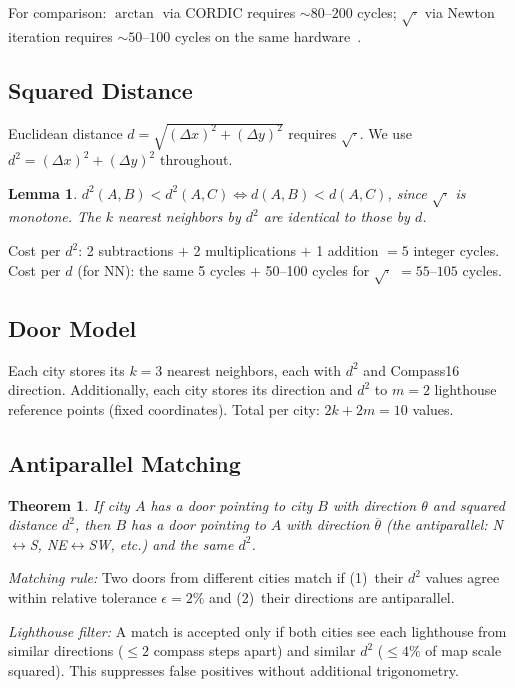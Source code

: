 \documentclass[11pt,a4paper,twocolumn]{article}
\newtheorem{theorem}{Theorem}
\newtheorem{lemma}{Lemma}
\begin{document}
For comparison: $\arctan$ via CORDIC requires ${\sim}80$--$200$ cycles; $\sqrt{\cdot}$ via Newton iteration requires ${\sim}50$--$100$ cycles on the same hardware~\cite{avr_manual}.

\subsection{Squared Distance}\label{sec:dsq}

Euclidean distance $d = \sqrt{(\Delta x)^2 + (\Delta y)^2}$ requires $\sqrt{\cdot}$. We use $d^2 = (\Delta x)^2 + (\Delta y)^2$ throughout.

\begin{lemma}
$d^2(A,B) < d^2(A,C) \Leftrightarrow d(A,B) < d(A,C)$, since $\sqrt{\cdot}$ is monotone. The $k$ nearest neighbors by $d^2$ are identical to those by $d$.
\end{lemma}

Cost per $d^2$: 2 subtractions $+$ 2 multiplications $+$ 1 addition $= 5$ integer cycles. Cost per $d$ (for NN): the same 5 cycles $+$ 50--100 cycles for $\sqrt{\cdot}$ $= 55$--$105$ cycles.

\subsection{Door Model}

Each city stores its $k{=}3$ nearest neighbors, each with $d^2$ and Compass16 direction. Additionally, each city stores its direction and $d^2$ to $m{=}2$ lighthouse reference points (fixed coordinates). Total per city: $2k + 2m = 10$ values.

\subsection{Antiparallel Matching}\label{sec:matching}

\begin{theorem}
If city $A$ has a door pointing to city $B$ with direction $\theta$ and squared distance $d^2$, then $B$ has a door pointing to $A$ with direction $\overline{\theta}$ (the antiparallel: N$\leftrightarrow$S, NE$\leftrightarrow$SW, etc.) and the same $d^2$.
\end{theorem}

\textit{Matching rule:} Two doors from different cities match if (1)~their $d^2$ values agree within relative tolerance $\epsilon{=}2\%$ and (2)~their directions are antiparallel.

\textit{Lighthouse filter:} A match is accepted only if both cities see each lighthouse from similar directions ($\leq 2$ compass steps apart) and similar $d^2$ ($\leq 4\%$ of map scale squared). This suppresses false positives without additional trigonometry.
\end{document}
